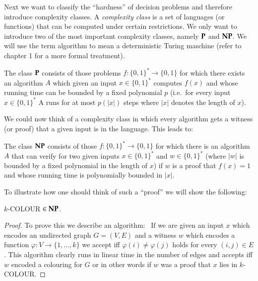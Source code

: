 Next we want to classify the ``hardness'' of decision problems and therefore introduce complexity classes. A \emph{complexity class}
 is a set of languages (or functions) that can be computed under certain restrictions. We only want to introduce two 
 of the most important complexity classes, namely $\mathbf{P}$ and $\mathbf{NP}$. We will use the term algorithm
 to mean a deterministic Turing maschine (refer to \cite{Arora2009} chapter 1 for a more formal treatment). 
 
\begin{Definition}
 The class $\mathbf{P}$ consists of those problems $f \colon {\lbrace 0,1 \rbrace}^* \to {\lbrace 0,1 \rbrace}$ for
 which there exists an algorithm $A$ which given an input $x \in {\lbrace 0,1 \rbrace}^*$
 computes $f(x)$ and whose running time can be bounded by a fixed polynomial $p$ (i.e.\
 for every input $x \in {\lbrace 0,1 \rbrace}^*$ A runs for at most $p(|x|)$ steps where $|x|$ denotes the length of $x$).
\end{Definition}

We could now think of a complexity class in which every algorithm gets a witness (or proof) that a given input is in the language.
This leads to:

\begin{Definition}
 The class $\mathbf{NP}$ consists of those $f \colon {\lbrace 0,1 \rbrace}^* \to {\lbrace 0,1 \rbrace}$ for which there is
 an algorithm $A$ that can verify for two given inputs $x \in {\lbrace 0,1 \rbrace}^*$ and 
 $w \in {\lbrace 0,1 \rbrace}^*$ (where $|w|$ is bounded by a fixed polynomial in the length of $x$) if $w$ is a proof
 that $f(x) = 1$ and whose running time is polynomially bounded in $|x|$.
\end{Definition}

To illustrate how one should think of such a ``proof''  we will show the following:

\begin{Proposition}
 $k$-COLOUR $\in \mathbf{NP}$.
\end{Proposition}

\begin{proof}
 To prove this we describe an algorithm: \
 If we are given an input $x$ which encodes an undirected graph $G = (V,E)$ and a witness $w$ which encodes a 
 function $\varphi \colon V \to \lbrace 1, \dotsc, k \rbrace$ we accept iff $\varphi(i) \neq \varphi(j)$ holds
 for every $(i,j) \in E$ .
 This algorithm clearly runs in linear time in the number of edges and accepts iff $w$ encoded a  colouring for $G$ or in other words if
 $w$ was a proof that $x$ lies in $k$-COLOUR.
\end{proof}

